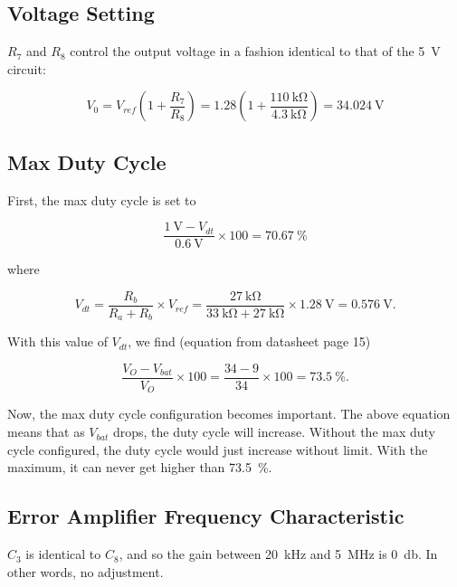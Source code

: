 \documentclass{article}
\newcommand{\Vbat}{$V_{bat}$}
\begin{document}
\subsection{Voltage Setting}
$R_7$ and $R_8$ control the output voltage in a fashion identical to
that of the \qty{5}{\volt} circuit:

\begin{displaymath}
  V_0 = V_{ref}(1+\frac{R_7}{R_8}) =
  1.28(1+\frac{\qty{110}{\kilo\ohm}}{\qty{4.3}{\kilo\ohm}}) = \qty{34.024}{\volt}
\end{displaymath}

\subsection{Max Duty Cycle}
First, the max duty cycle is set to

\begin{displaymath}
  \frac{\qty{1}{\volt} - V_{dt}}{\qty{0.6}{\volt}} \times{} 100 = \qty{70.67}{\%}
\end{displaymath}

\noindent
where

\begin{displaymath}
  V_{dt} = \frac{R_b}{R_a+R_b} \times{} V_{ref} =
  \frac{\qty{27}{\kilo\ohm}}{\qty{33}{\kilo\ohm} +
    \qty{27}{\kilo\ohm}} \times \qty{1.28}{\volt} = \qty{0.576}{\volt}.
\end{displaymath}

With this value of $V_{dt}$, we find (equation from datasheet page 15)

\begin{displaymath}
  \frac{V_O - V_{bat}}{V_O} \times{} 100 = \frac{34 - 9}{34} \times{}
  100 = \qty{73.5}{\%}.
\end{displaymath}

Now, the max duty cycle configuration becomes important. The above
equation means that as \Vbat{} drops, the duty cycle will
increase. Without the max duty cycle configured, the duty cycle would
just increase without limit. With the maximum, it can never get higher
than \qty{73.5}{\%}.

\subsection{Error Amplifier Frequency Characteristic}
$C_3$ is identical to $C_8$, and so the gain between
\qty{20}{\kilo\hertz} and \qty{5}{\mega\hertz} is
\qty{0}{\decibel}. In other words, no adjustment.
\end{document}
